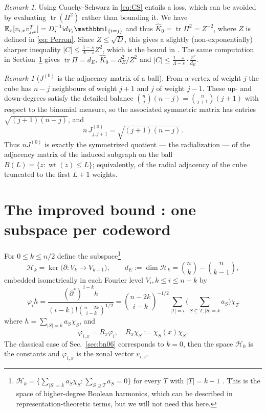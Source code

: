 \documentclass[11pt]{amsart}
\theoremstyle{plain}
\theoremstyle{remark}
\newtheorem{remark}[theorem]{Remark}
\newcommand{\tr}{\operatorname{tr}}
\newcommand{\cH}{\mathcal H}
\newcommand{\wt}{\operatorname{wt}}
\begin{document}
\begin{remark}\label{rem: LP}
Using Cauchy-Schwarz in \eqref{eq:CS} entails a loss, which can be avoided by evaluating $\tr(\Pi^{2})$ rather than bounding it. We have ${\mathbb E}_x[v_{i,x}v_{j,x}^T]=D_i^{-1}{\mathrm id}_{V_i}{\mathbbm 1}_{\{i= j\}}$ and thus $\widehat K_0=\tr{\Pi^2}=Z^{-2}$, where $Z$ is defined in \eqref{eq: Perron}. Since $Z\le \sqrt{D}$, this gives a slightly (non-exponentially) sharper inequality $|C|\le\frac{1-s}{\Lambda -s}Z^2$, which is the bound in \cite{BN06}.
The same computation in Section~\ref{sec:enlarge} gives
$\operatorname{tr}\Pi=d_E$, $\widehat K_0=d_E^{2}/Z^{2}$ and
$|C|\le\frac{1-s}{\Lambda-s}\cdot\frac{Z^{2}}{d_E}$.
\end{remark}


\begin{remark}[$J^{(0)}$ is the adjacency matrix of a ball]\label{rem:ball}
From a vertex of weight $j$ the cube has $n-j$ neighbours of weight $j+1$
and $j$ of weight $j-1$. These up- and down-degrees satisfy the detailed
balance $\binom nj(n-j)=\binom n{j+1}(j+1)$ with respect to the binomial
measure, so the associated symmetric matrix has entries
$\sqrt{(j+1)(n-j)}$, and
\[
 n\,J^{(0)}_{j,j+1}=\sqrt{(j+1)(n-j)} .
\]
Thus $nJ^{(0)}$ is exactly the symmetrized quotient --- the radialization ---
of the adjacency matrix of the induced subgraph on the ball
$B(L)=\{z\colon \wt(z)\le L\}$; equivalently, of the radial adjacency of the
cube truncated to the first $L+1$ weights.
\end{remark}

\section{The improved bound : one subspace per codeword}\label{sec:enlarge}
For $0\le k\le n/2$ define the subspace\footnote{
$\cH_k=\{\sum_{|S|=k} a_S\chi_S:\sum_{S\supseteq T}a_S=0\}$ for every $T$ with $|T|=k-1$ \cite[Sec.II]{Schrijver05}. This is the space of higher-degree Boolean harmonics, which can be described in representation-theoretic terms, but we will not need this here.} 
\[
 \cH_k=\ker\bigl(\partial\colon V_k\to V_{k-1}\bigr), %
 \qquad
 d_E:=\dim\cH_k=\binom nk-\binom n{k-1},
\]
embedded isometrically in each Fourier level $V_i, k\le i\le n-k$ by
  $$
     \varphi_i h=\frac{(\partial^{*})^{\,i-k}h}
 {(i-k)! \binom{n-2k}{i-k}^{1/2}}=\binom{n-2k}{i-k}^{-1/2}\sum_{|T|=i}\Big(\sum_{S\subseteq T, |S|=k}a_S\Big)\chi_T
  $$
where $h=\sum_{|S|=k} a_S\chi_S$, and
  $$
  \varphi_{i,x}=R_x\varphi_i,\quad R_x\chi_S:=\chi_S(x)\chi_S .
  $$
The classical case of Sec.~\ref{sec:bn06} corresponds to $k=0$, then the space $\cH_0$ is the constants and 
$\varphi_{i,x}$ is
the zonal vector $v_{i,x}$.
\end{document}
